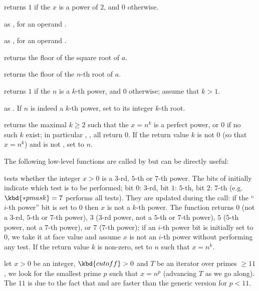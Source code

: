  returns $1$ if the  $x$ is a power of
$2$, and $0$ otherwise.

 as ,
for an  operand .

 as ,
for an  operand .

 returns the floor of the square root of $a$.

 returns the floor of the $n$-th root
of $a$.

 returns $1$ if the  $n$ is a
$k$-th power, and $0$ otherwise; assume that $k > 1$.

 as . If
$n$ is indeed a $k$-th power, set  to its integer $k$-th root.

 returns the maximal $k\geq 2$  such
that the  $x = n^k$ is a perfect power, or $0$ if no such $k$ exist;
in particular , ,  all
return 0. If the return value $k$ is not $0$ (so that $x = n^k$) and
 is not , set  to $n$.

The following low-level functions are called by  but can
be directly useful:

 tests whether the
integer $x > 0$ is a $3$-rd, $5$-th or $7$-th power. The bits of 
initially indicate which test is to be performed;
bit $0$: $3$-rd,
bit $1$: $5$-th,
bit $2$: $7$-th (e.g.~$\kbd{*pmask} = 7$ performs all tests). They are
updated during the call: if the ``$i$-th power'' bit is set to $0$
then $x$ is not a $k$-th power. The function returns $0$
(not a
$3$-rd,
$5$-th or
$7$-th power),
$3$
($3$-rd power,
not a $5$-th or
$7$-th power),
$5$
($5$-th power,
not a $7$-th power),
or $7$
($7$-th power); if an $i$-th power bit is initially set to $0$, we take it
at face value and assume $x$ is not an $i$-th power without performing any
test. If the return value $k$ is non-zero, set  to $n$ such that $x
= n^k$.

let $x > 0$ be an integer, $\kbd{cutoff} > 0$ and $T$ be an iterator over
primes $\geq 11$, we look for the smallest prime $p$ such that $x = n^p$
(advancing $T$ as we go along). The $11$ is due to the fact that
 and  are faster than the generic version for
$p < 11$.

